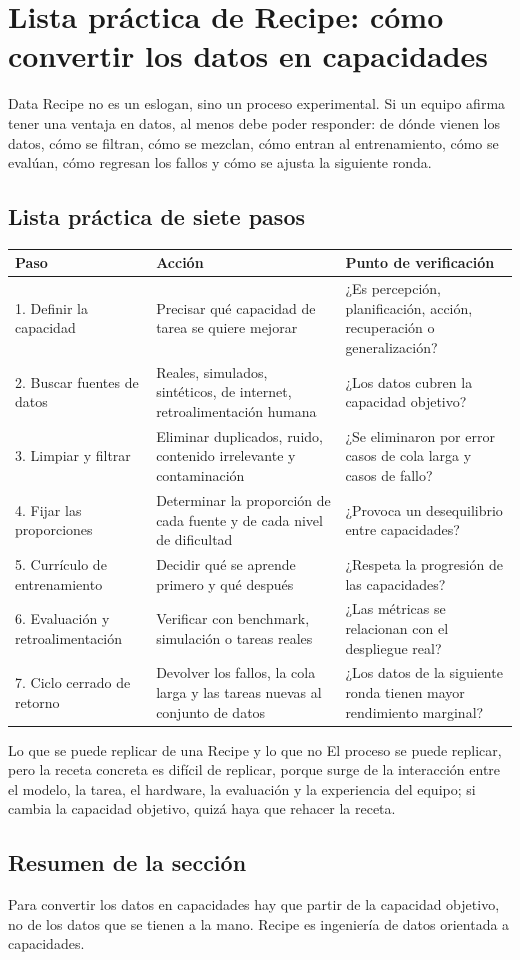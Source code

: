 \section{Lista práctica de Recipe: cómo convertir los datos en capacidades}

Data Recipe no es un eslogan, sino un proceso experimental. Si un equipo afirma tener una ventaja en datos, al menos debe poder responder: de dónde vienen los datos, cómo se filtran, cómo se mezclan, cómo entran al entrenamiento, cómo se evalúan, cómo regresan los fallos y cómo se ajusta la siguiente ronda.

\subsection{Lista práctica de siete pasos}

\noindent\begin{longtable}{p{}p{}p{}}
\toprule
Paso & Acción & Punto de verificación \\
\midrule
1. Definir la capacidad & Precisar qué capacidad de tarea se quiere mejorar & ¿Es percepción, planificación, acción, recuperación o generalización? \\
2. Buscar fuentes de datos & Reales, simulados, sintéticos, de internet, retroalimentación humana & ¿Los datos cubren la capacidad objetivo? \\
3. Limpiar y filtrar & Eliminar duplicados, ruido, contenido irrelevante y contaminación & ¿Se eliminaron por error casos de cola larga y casos de fallo? \\
4. Fijar las proporciones & Determinar la proporción de cada fuente y de cada nivel de dificultad & ¿Provoca un desequilibrio entre capacidades? \\
5. Currículo de entrenamiento & Decidir qué se aprende primero y qué después & ¿Respeta la progresión de las capacidades? \\
6. Evaluación y retroalimentación & Verificar con benchmark, simulación o tareas reales & ¿Las métricas se relacionan con el despliegue real? \\
7. Ciclo cerrado de retorno & Devolver los fallos, la cola larga y las tareas nuevas al conjunto de datos & ¿Los datos de la siguiente ronda tienen mayor rendimiento marginal? \\
\bottomrule
\end{longtable}

\begin{knowledgebox}{Lo que se puede replicar de una Recipe y lo que no}
El proceso se puede replicar, pero la receta concreta es difícil de replicar, porque surge de la interacción entre el modelo, la tarea, el hardware, la evaluación y la experiencia del equipo; si cambia la capacidad objetivo, quizá haya que rehacer la receta.
\end{knowledgebox}

\subsection{Resumen de la sección}

Para convertir los datos en capacidades hay que partir de la capacidad objetivo, no de los datos que se tienen a la mano. Recipe es ingeniería de datos orientada a capacidades.
